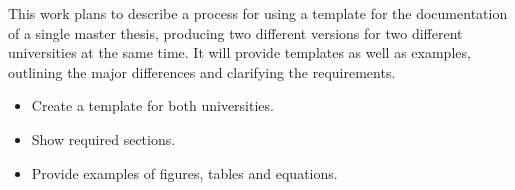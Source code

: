 \label{sec:objective}
This work plans to describe a process for using a template for the documentation of a single master thesis, producing two different versions for two different universities at the same time. It will provide templates as well as examples, outlining the major differences and clarifying the requirements.

\begin{itemize} 
    \item Create a template for both universities.
    \item Show required sections.
    \item Provide examples of figures, tables and equations.
\end{itemize}